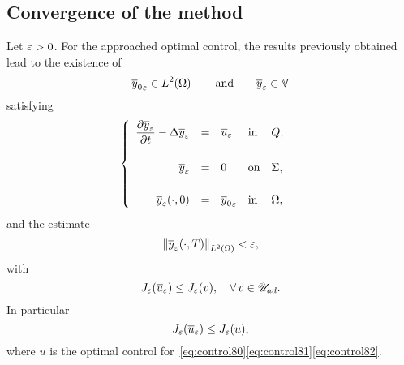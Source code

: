 \subsection{Convergence of the method}\label{sec:convergence}

Let $\varepsilon > 0$. For the approached optimal control, the results previously
obtained lead to the existence of
\begin{equation*}
    {\overline{y}_{0}}_{\varepsilon}\in L^{2}\!\left({\Omega}\right)\qquad\text{and}\qquad
    {\overline{y}}_{\varepsilon}\in\mathbb{V}
\end{equation*}
satisfying
\begin{equation}\label{eq:control89}
    \begin{cases}\displaystyle
        \begin{array}{rclll}
            \dfrac{\partial{}{\overline{y}}_{\varepsilon}}{\partial{}t} - \Delta{\overline{y}}_{\varepsilon} & = & {\overline{u}}_{\varepsilon} &
            \text{in} & Q,\\
            \\
            {\overline{y}}_{\varepsilon} & = & 0 & \text{on} & \Sigma,\\
            \\
            {{\overline{y}}_{\varepsilon}}\!\left({\cdot, 0}\right) & = & {\overline{y}_{0}}_{\varepsilon} &
            \text{in} & \Omega,
        \end{array}
    \end{cases}
\end{equation}
and the estimate
\begin{equation}
    {\left\|{ { {\overline{y}}_{\varepsilon} }\!\left({\cdot,T}\right)   }\right\|}_{L^{2}\left({\Omega}\right)} < \varepsilon,
\end{equation}
with
\begin{equation}
    J_{\varepsilon}\!\left({{\overline{u}}_{\varepsilon}}\right)\leq J_{\varepsilon}(v),\quad
    \forall\,v\in{\mathscr{U}}_{ad}.
\end{equation}
In particular
\begin{equation}\label{eq:control92}
    J_{\varepsilon}\!\left({{\overline{u}}_{\varepsilon}}\right) \leq J_{\varepsilon}(u),
\end{equation}
where $u$ is the optimal control
for~\eqref{eq:control80}\eqref{eq:control81}\eqref{eq:control82}.


